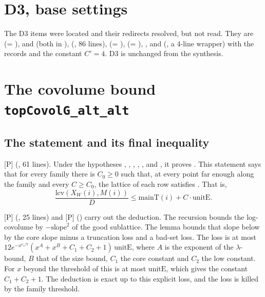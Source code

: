\documentclass[11pt]{article}
\newcommand{\mP}{\textsf{[P]}}
\theoremstyle{remark}
\begin{document}
\section{D3, base settings}\label{sec:d3}

The D3 items were located and their redirects resolved, but not read. They are  (= ),  and  (both in ),  (, 86 lines),  (= ),  (= ), , and  (, a 4-line wrapper) with the records  and the constant $C'=4$. D3 is unchanged from the synthesis.

\section{The covolume bound \texttt{topCovolG\_alt\_alt}}\label{sec:covol}

\subsection{The statement and its final inequality}

\mP{}  (, 61 lines). Under the hypotheses , , , , ,  and , it proves . This statement says that for every family there is $C_0\ge0$ such that, at every point far enough along the family and every $C\ge C_0$, the lattice of each row satisfies . That is,
\[
\frac{\mathrm{lcv}(X_W(i),M(i))}{D}\le\mathrm{mainT}(i)+C\cdot\mathrm{unitE}.
\]

\mP{}  (, 25 lines) and \mP{}  () carry out the deduction. The recursion  bounds the log-covolume by $-\mathrm{slope}^2$ of the good sublattice. The lemma  bounds that slope below by the core slope minus a truncation loss and a bad-set loss. The loss is at most $12e^{-x^{e_z/7}}(x^A+x^B+C_1+C_2+1)\,\mathrm{unitE}$, where $A$ is the exponent of the $\lambda$-bound, $B$ that of the size bound, $C_1$ the core constant and $C_2$ the low constant. For $x$ beyond the threshold of  this is at most $\mathrm{unitE}$, which gives the constant $C_1+C_2+1$. The deduction is exact up to this explicit loss, and the loss is killed by the family threshold.
\end{document}
